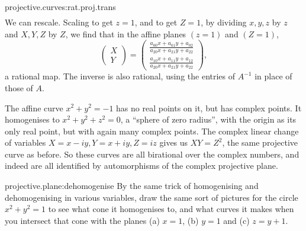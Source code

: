 \begin{answer}{projective.curves:rat.proj.trans}
\begin{align*}
\end{align*}
We can rescale. 
Scaling to get \(z=1\), and to get \(Z=1\), by dividing \(x,y,z\) by \(z\) and \(X,Y,Z\) by \(Z\), we find that in the affine planes \((z=1)\) and \((Z=1)\),
\[
\begin{pmatrix}
X\\[5pt]
Y
\end{pmatrix}
=
\begin{pmatrix}
\frac{a_{00}x+a_{01}y+a_{02}}{a_{20}x+a_{21}y+a_{22}} \\[5pt]
\frac{a_{10}x+a_{11}y+a_{12}}{a_{20}x+a_{21}y+a_{22}}
\end{pmatrix},
\]
a rational map.
The inverse is also rational, using the entries of \(A^{-1}\) in place of those of \(A\).
\end{answer}
\begin{example}
The affine curve \(x^2+y^2=-1\) has no real points on it, but has complex points.
It homogenises to \(x^2+y^2+z^2=0\), a ``sphere of zero radius'', with the origin as its only real point, but with again many complex points.
The complex linear change of variables \(X=x-iy, Y=x+iy, Z=iz\) gives us \(XY=Z^2\), the same projective curve as before.
So these curves are all birational over the complex numbers, and indeed are all identified by automorphisms of the complex projective plane.
\end{example}
\begin{problem}{projective.plane:dehomogenise}
By the same trick of homogenising and dehomogenising in various variables, draw the same sort of pictures for the circle \(x^2+y^2=1\) to see what cone it homogenises to, and what curves it makes when you intersect that cone with the planes (a) \(x=1\), (b) \(y=1\) and (c) \(z=y+1\). 
\end{problem}

